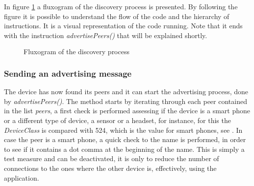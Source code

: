 In figure \ref{fig:discflux} a fluxogram of the discovery process is presented. By following the figure it is possible to understand the flow of the code and the hierarchy of instructions. It is a visual representation of the code running. Note that it ends with the instruction \textit{advertisePeers()} that will be explained shortly.

\begin{figure}[ht]
   \noindent{}
	\caption{\label{fig:discflux} Fluxogram of the discovery process}
\end{figure}

\subsubsection{Sending an advertising message}
\label{subsubsec:sendadv}

The device has now found its peers and it can start the advertising process, done by \textit{advertisePeers()}. The method starts by iterating through each peer contained in the list \textit{peers}, a first check is performed assessing if the device is a smart phone or a different type of device, a sensor or a headset, for instance, for this the \textit{DeviceClass} is compared with 524, which is the value for smart phones, see \cite{btclass}. 
In case the peer is a smart phone, a quick check to the name is performed, in order to see if it contains a dot comma at the beginning of the name. This is simply a test measure and can be deactivated, it is only to reduce the number of connections to the ones where the other device is, effectively, using the application.

